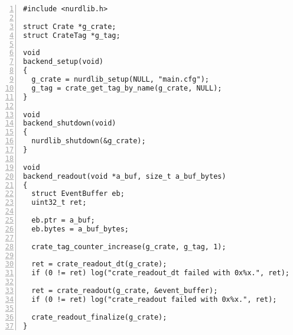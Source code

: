 \documentclass{article}
\begin{document}
\begin{Verbatim}[frame=single,numbers=left]
#include <nurdlib.h>

struct Crate *g_crate;
struct CrateTag *g_tag;

void
backend_setup(void)
{
  g_crate = nurdlib_setup(NULL, "main.cfg");
  g_tag = crate_get_tag_by_name(g_crate, NULL);
}

void
backend_shutdown(void)
{
  nurdlib_shutdown(&g_crate);
}

void
backend_readout(void *a_buf, size_t a_buf_bytes)
{
  struct EventBuffer eb;
  uint32_t ret;

  eb.ptr = a_buf;
  eb.bytes = a_buf_bytes;

  crate_tag_counter_increase(g_crate, g_tag, 1);

  ret = crate_readout_dt(g_crate);
  if (0 != ret) log("crate_readout_dt failed with 0x%x.", ret);

  ret = crate_readout(g_crate, &event_buffer);
  if (0 != ret) log("crate_readout failed with 0x%x.", ret);

  crate_readout_finalize(g_crate);
}
\end{Verbatim}
\end{document}
